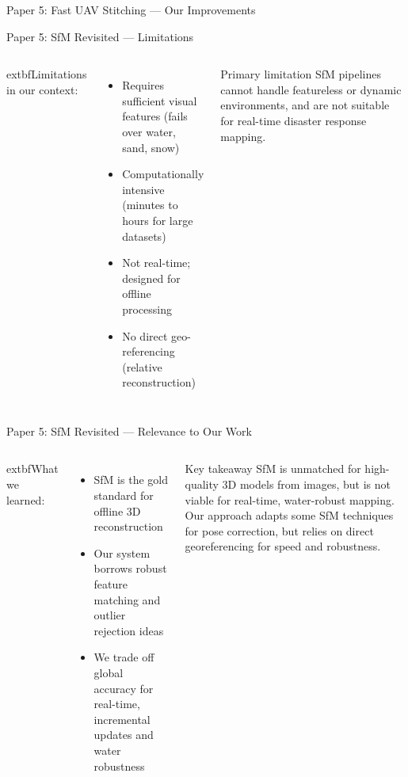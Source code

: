\documentclass[aspectratio=169, 11pt]{beamer}
\begin{document}
\begin{frame}{Paper 5: Fast UAV Stitching --- Our Improvements}
\end{frame}

\begin{frame}{Paper 5: SfM Revisited --- Limitations}
\small
\begin{columns}[T]
	extbf{Limitations in our context:}
\begin{itemize}
    \item Requires sufficient visual features (fails over water, sand, snow)
    \item Computationally intensive (minutes to hours for large datasets)
    \item Not real-time; designed for offline processing
    \item No direct geo-referencing (relative reconstruction)
\end{itemize}

\begin{alertblock}{Primary limitation}
SfM pipelines cannot handle featureless or dynamic environments, and are not suitable for real-time disaster response mapping.
\end{alertblock}
\end{columns}
\end{frame}

\begin{frame}{Paper 5: SfM Revisited --- Relevance to Our Work}
\small
\begin{columns}[T]
	extbf{What we learned:}
\begin{itemize}
    \item SfM is the gold standard for offline 3D reconstruction
    \item Our system borrows robust feature matching and outlier rejection ideas
    \item We trade off global accuracy for real-time, incremental updates and water robustness
\end{itemize}

\begin{exampleblock}{Key takeaway}
SfM is unmatched for high-quality 3D models from images, but is not viable for real-time, water-robust mapping. Our approach adapts some SfM techniques for pose correction, but relies on direct georeferencing for speed and robustness.
\end{exampleblock}
\end{columns}
\end{frame}
\end{document}
